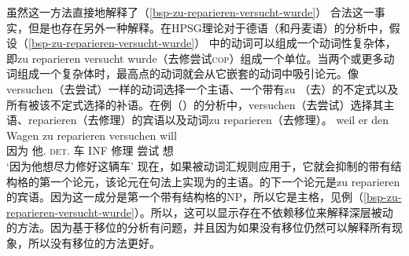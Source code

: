 \z
虽然这一方法直接地解释了（\ref{bsp-zu-reparieren-versucht-wurde}） 合法这一事实，但是也存在另外一种解释。在HPSG理论对于德语（和丹麦语）的分析中，假设（\ref{bsp-zu-reparieren-versucht-wurde}） 中的动词可以组成一个动词性复杂体，即zu reparieren versucht wurde（去修尝试\textsc{cop}）组成一个单位。当两个或更多动词组成一个复杂体时，最高点的动词就会从它嵌套的动词中吸引论元\citep{HN89a,HN94a,BvN98}。像versuchen（去尝试）一样的动词选择一个主语、一个带有zu （去）的不定式以及所有被该不定式选择的补语。在例（）的分析中，versuchen（去尝试）选择其主语、reparieren（去修理）的宾语以及动词zu reparieren（去修理）。
\ea
\gll weil er den Wagen zu reparieren versuchen will\\
     因为 他.\nom{} \textsc{det}.\acc{} 车 INF 修理 尝试 想\\
\glt `因为他想尽力修好这辆车'
\z
现在，如果被动词汇规则应用于，它就会抑制的带有结构格的第一个论元，该论元在句法上实现为的主语。的下一个论元是zu reparieren的宾语。因为这一成分是第一个带有结构格的NP，所以它是主格，见例（\ref{bsp-zu-reparieren-versucht-wurde}）。所以，这可以显示存在不依赖移位来解释深层被动的方法。因为基于移位的分析有问题，并且因为如果没有移位仍然可以解释所有现象，所以没有移位的方法更好。
